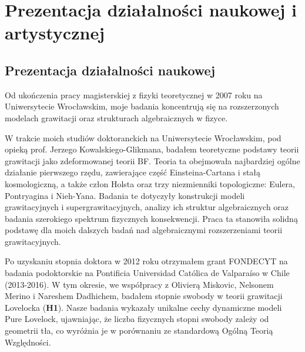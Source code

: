 \documentclass[12pt,a4paper]{article}
\begin{document}



%


\section{Prezentacja działalności naukowej i artystycznej}

\subsection*{Prezentacja działalności naukowej}

\indent\indent Od ukończenia pracy magisterskiej z fizyki teoretycznej w 2007 roku na Uniwersytecie Wrocławskim, moje badania koncentrują się na rozszerzonych modelach grawitacji oraz strukturach algebraicznych w fizyce.

W trakcie moich studiów doktoranckich na Uniwersytecie Wrocławskim, pod opieką prof. Jerzego Kowalskiego-Glikmana, badałem teoretyczne podstawy teorii grawitacji jako zdeformowanej teorii BF. Teoria ta obejmowała najbardziej ogólne działanie pierwszego rzędu, zawierające część Einsteina-Cartana i stałą kosmologiczną, a także człon Holsta oraz trzy niezmienniki topologiczne: Eulera, Pontryagina i Nieh-Yana. Badania te dotyczyły konstrukcji modeli grawitacyjnych i supergrawitacyjnych, analizy ich struktur algebraicznych oraz badania szerokiego spektrum fizycznych konsekwencji. Praca ta stanowiła solidną podstawę dla moich dalszych badań nad algebraicznymi rozszerzeniami teorii grawitacyjnych.

Po uzyskaniu stopnia doktora w 2012 roku otrzymałem grant FONDECYT na badania podoktorskie na Pontificia Universidad Católica de Valparaíso w Chile (2013-2016). W tym okresie, we współpracy z Olivierą Miskovic, Nelsonem Merino i Nareshem Dadhichem, badałem stopnie swobody w teorii grawitacji Lovelocka (\textbf{H1}). Nasze badania wykazały unikalne cechy dynamiczne modeli Pure Lovelock, ujawniając, że liczba fizycznych stopni swobody zależy od geometrii tła, co wyróżnia je w porównaniu ze standardową Ogólną Teorią Względności.
\end{document}

